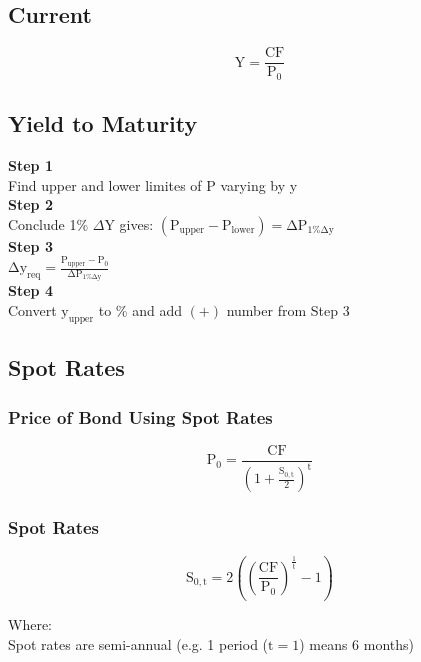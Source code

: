 \documentclass[11pt, english]{article}
\begin{document}
	\subsection{Current}

	$$\mathrm{Y=\frac{CF}{P_0}}$$

	\subsection{Yield to Maturity}

	\begin{center}
	\textbf{Step 1}\\

	Find upper and lower limites of P varying by y\\

	\textbf{Step 2}\\

	Conclude 1\% $\Delta$Y gives: $\mathrm{(P_{upper}-P_{lower})=\Delta P_{1\%\Delta y}}$\\

	\textbf{Step 3}\\

	$\mathrm{\Delta y_{req}=\frac{P_{upper}-P_0}{\Delta P_{1\%\Delta y}}}$\\

	\textbf{Step 4}\\

	Convert $\mathrm{y_{upper}}$ to \% and add $(+)$ number from Step 3

	\end{center}

	\subsection{Spot Rates}

		\subsubsection{Price of Bond Using Spot Rates}

	$$\mathrm{P_0=\frac{CF}{\left(1+\frac{S_{0,t}}{2}\right)^t}}$$

		\subsubsection{Spot Rates}

	$$\mathrm{S_{0,t}=2\left(\left(\frac{CF}{P_0}\right)^{\frac{1}{t}}-1\right)}$$

	Where:\\
	Spot rates are semi-annual (e.g. 1 period ($\mathrm{t=1}$) means 6 months)
\end{document}
